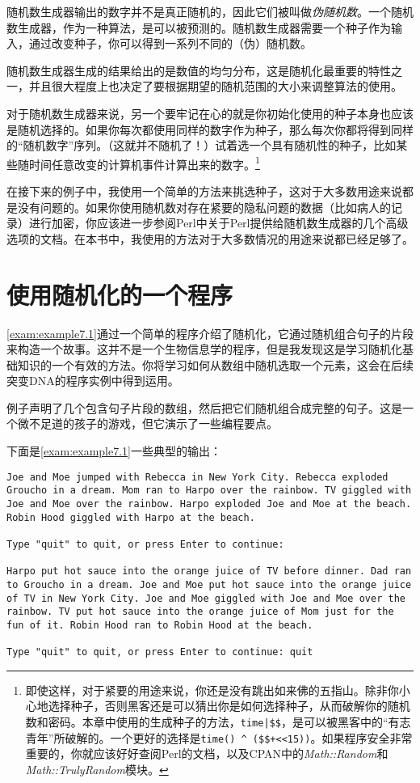 随机数生成器输出的数字并不是真正随机的，因此它们被叫做\textit{伪随机数}。一个随机数生成器，作为一种算法，是可以被预测的。随机数生成器需要一个种子作为输入，通过改变种子，你可以得到一系列不同的（伪）随机数。

随机数生成器生成的结果给出的是数值的均匀分布，这是随机化最重要的特性之一，并且很大程度上也决定了要根据期望的随机范围的大小来调整算法的使用。

对于随机数生成器来说，另一个要牢记在心的就是你初始化使用的种子本身也应该是随机选择的。如果你每次都使用同样的数字作为种子，那么每次你都将得到同样的“随机数字”序列。（这就并不随机了！）试着选一个具有随机性的种子，比如某些随时间任意改变的计算机事件计算出来的数字。\footnote{即使这样，对于紧要的用途来说，你还是没有跳出如来佛的五指山。除非你小心地选择种子，否则黑客还是可以猜出你是如何选择种子，从而破解你的随机数和密码。本章中使用的生成种子的方法，\verb=time|$$=，是可以被黑客中的“有志青年”所破解的。一个更好的选择是\verb=time() ^ ($$+<<15))=。如果程序安全非常重要的，你就应该好好查阅Perl的文档，以及CPAN中的\textit{Math::Random}和\textit{Math::TrulyRandom}模块。}

在接下来的例子中，我使用一个简单的方法来挑选种子，这对于大多数用途来说都是没有问题的。如果你使用随机数对存在紧要的隐私问题的数据（比如病人的记录）进行加密，你应该进一步参阅Perl中关于Perl提供给随机数生成器的几个高级选项的文档。在本书中，我使用的方法对于大多数情况的用途来说都已经足够了。

\section{使用随机化的一个程序}
\autoref{exam:example7.1}通过一个简单的程序介绍了随机化，它通过随机组合句子的片段来构造一个故事。这并不是一个生物信息学的程序，但是我发现这是学习随机化基础知识的一个有效的方法。你将学习如何从数组中随机选取一个元素，这会在后续突变DNA的程序实例中得到运用。

例子声明了几个包含句子片段的数组，然后把它们随机组合成完整的句子。这是一个微不足道的孩子的游戏，但它演示了一些编程要点。



下面是\autoref{exam:example7.1}一些典型的输出：

\begin{lstlisting}[breaklines=true]
Joe and Moe jumped with Rebecca in New York City. Rebecca exploded Groucho in a dream. Mom ran to Harpo over the rainbow. TV giggled with Joe and Moe over the rainbow. Harpo exploded Joe and Moe at the beach. Robin Hood giggled with Harpo at the beach. 

Type "quit" to quit, or press Enter to continue: 

Harpo put hot sauce into the orange juice of TV before dinner. Dad ran to Groucho in a dream. Joe and Moe put hot sauce into the orange juice of TV in New York City. Joe and Moe giggled with Joe and Moe over the rainbow. TV put hot sauce into the orange juice of Mom just for the fun of it. Robin Hood ran to Robin Hood at the beach. 

Type "quit" to quit, or press Enter to continue: quit
\end{lstlisting}

